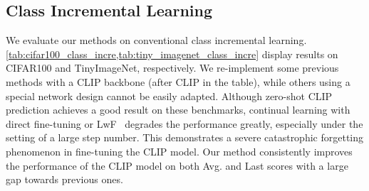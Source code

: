 \subsection{Class Incremental Learning}
\label{subsec:cil}

We evaluate our methods on conventional class incremental learning.
\cref{tab:cifar100_class_incre,tab:tiny_imagenet_class_incre} display results on CIFAR100 and TinyImageNet, respectively. 
We re-implement some previous methods with a CLIP backbone (after CLIP in the table), while others using a special network design cannot be easily adapted. Although zero-shot CLIP prediction achieves a good result on these benchmarks, continual learning with direct fine-tuning or LwF~\cite{li2017learning} degrades the performance greatly, especially under the setting of a large step number. This demonstrates a severe catastrophic forgetting phenomenon in fine-tuning the CLIP model. Our method consistently improves the performance of the CLIP model on both Avg. and Last scores with a large gap towards previous ones. 
